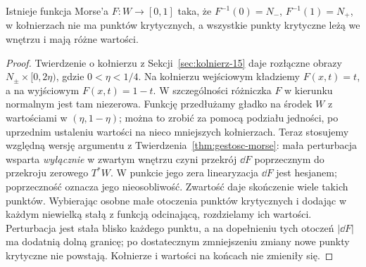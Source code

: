 \begin{stwierdzenie}
\label{prop:morse-kobordyzm-18}
Istnieje funkcja Morse'a
$F:W\to[0,1]$ taka, że
$F^{-1}(0)=N_-$, $F^{-1}(1)=N_+$,
w kołnierzach nie ma punktów krytycznych,
a wszystkie punkty krytyczne leżą we wnętrzu
i mają różne wartości.
\end{stwierdzenie}
\begin{proof}
Twierdzenie o kołnierzu z
Sekcji~\ref{sec:kolnierz-15} daje rozłączne
obrazy $N_\pm\times[0,2\eta)$, gdzie $0<\eta<1/4$.
Na kołnierzu wejściowym kładziemy $F(x,t)=t$,
a na wyjściowym $F(x,t)=1-t$.
W szczególności różniczka $F$ w kierunku
normalnym jest tam niezerowa.
Funkcję przedłużamy gładko na środek $W$
z wartościami w $(\eta,1-\eta)$; można to
zrobić za pomocą podziału jedności, po
uprzednim ustaleniu wartości na nieco mniejszych
kołnierzach. Teraz stosujemy względną wersję
argumentu z Twierdzenia~\ref{thm:gestosc-morse}:
mała perturbacja wsparta \emph{wyłącznie}
w zwartym wnętrzu czyni przekrój $\dd F$
poprzecznym do przekroju zerowego $T^*W$.
W punkcie jego zera linearyzacja $\dd F$
jest hesjanem; poprzeczność oznacza jego
nieosobliwość. Zwartość daje skończenie wiele
takich punktów. Wybierając osobne małe
otoczenia punktów krytycznych i dodając
w każdym niewielką stałą z funkcją odcinającą,
rozdzielamy ich wartości. Perturbacja jest
stała blisko każdego punktu, a na dopełnieniu
tych otoczeń $|\dd F|$ ma dodatnią dolną
granicę; po dostatecznym zmniejszeniu zmiany
nowe punkty krytyczne nie powstają.
Kołnierze i wartości na końcach nie zmieniły się.
\end{proof}

